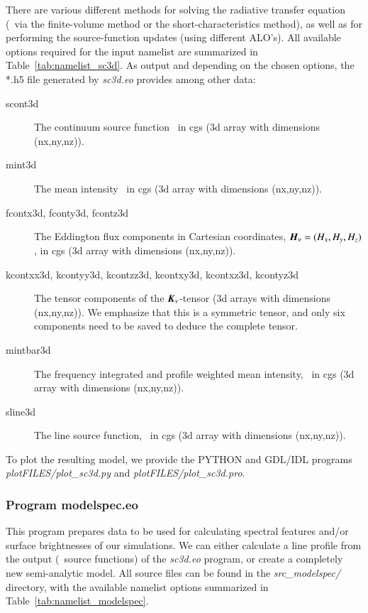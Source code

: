 \documentclass[10pt,a4paper]{article}
\begin{document}
There are various different methods for solving the radiative transfer
equation (\eg~via the finite-volume method or the
short-characteristics method), as well as for performing the
source-function updates (using different ALO's).
All available options required for the input namelist are summarized
in Table~\ref{tab:namelist_sc3d}. As output and depending on the
chosen options, the *.h5 file generated by \textit{sc3d.eo} provides
among other data:
\begin{description}
\item[scont3d] The continuum source function \scont~in cgs (3d array with dimensions (nx,ny,nz)).
\item[mint3d] The mean intensity \Jnu~in cgs (3d array with dimensions (nx,ny,nz)).
\item[fcontx3d, fconty3d, fcontz3d] The Eddington flux components in Cartesian coordinates, $\boldsymbol{H}_\nu = (H_x, H_y, H_z)$, in cgs (3d array with dimensions (nx,ny,nz)).
\item[kcontxx3d, kcontyy3d, kcontzz3d, kcontxy3d, kcontxz3d,
  kcontyz3d] The tensor components of the $\boldsymbol{K}_\nu$-tensor (3d arrays with dimensions (nx,ny,nz)). We
  emphasize that this is a symmetric tensor, and only six components need to be saved to deduce the complete tensor.
\item[mintbar3d] The frequency integrated and profile weighted mean intensity, \Jbar~in cgs (3d array with dimensions (nx,ny,nz)).
\item[sline3d] The line source function, \sline~in cgs (3d array with dimensions (nx,ny,nz)).
\end{description}

To plot the resulting model, we provide the PYTHON and GDL/IDL
programs \textit{plotFILES/plot\_sc3d.py} and
\textit{plotFILES/plot\_sc3d.pro}.
%

\subsubsection{Program modelspec.eo}
This program prepares data to be used for calculating spectral
features and/or surface brightnesses of our simulations.
We can either calculate a line profile from the output (\ie~source
functions) of the \textit{sc3d.eo} program, or create a completely new
semi-analytic model. All source files can be found in the
\textit{src\_modelspec/} directory, with the available namelist options summarized in Table~\ref{tab:namelist_modelspec}.
\end{document}
